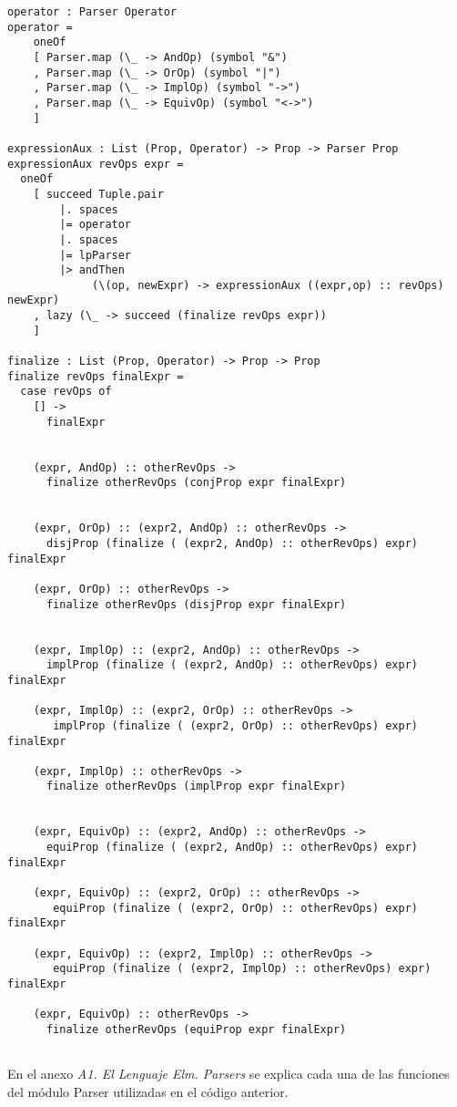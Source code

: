 \documentclass[a4paper]{report}
\begin{document}
\begin{lstlisting}[caption={Módulo LP\_Parser}, mathescape=true]
operator : Parser Operator
operator = 
    oneOf
    [ Parser.map (\_ -> AndOp) (symbol "&")
    , Parser.map (\_ -> OrOp) (symbol "|")
    , Parser.map (\_ -> ImplOp) (symbol "->")
    , Parser.map (\_ -> EquivOp) (symbol "<->")
    ]

expressionAux : List (Prop, Operator) -> Prop -> Parser Prop
expressionAux revOps expr =
  oneOf
    [ succeed Tuple.pair
        |. spaces
        |= operator
        |. spaces
        |= lpParser
        |> andThen 
             (\(op, newExpr) -> expressionAux ((expr,op) :: revOps) newExpr)
    , lazy (\_ -> succeed (finalize revOps expr))
    ]

finalize : List (Prop, Operator) -> Prop -> Prop
finalize revOps finalExpr =
  case revOps of
    [] ->
      finalExpr

     
    (expr, AndOp) :: otherRevOps ->
      finalize otherRevOps (conjProp expr finalExpr)


    (expr, OrOp) :: (expr2, AndOp) :: otherRevOps ->
      disjProp (finalize ( (expr2, AndOp) :: otherRevOps) expr) finalExpr

    (expr, OrOp) :: otherRevOps ->
      finalize otherRevOps (disjProp expr finalExpr)


    (expr, ImplOp) :: (expr2, AndOp) :: otherRevOps ->
      implProp (finalize ( (expr2, AndOp) :: otherRevOps) expr) finalExpr

    (expr, ImplOp) :: (expr2, OrOp) :: otherRevOps ->
       implProp (finalize ( (expr2, OrOp) :: otherRevOps) expr) finalExpr

    (expr, ImplOp) :: otherRevOps ->
      finalize otherRevOps (implProp expr finalExpr)


    (expr, EquivOp) :: (expr2, AndOp) :: otherRevOps ->
      equiProp (finalize ( (expr2, AndOp) :: otherRevOps) expr) finalExpr

    (expr, EquivOp) :: (expr2, OrOp) :: otherRevOps ->
       equiProp (finalize ( (expr2, OrOp) :: otherRevOps) expr) finalExpr

    (expr, EquivOp) :: (expr2, ImplOp) :: otherRevOps ->
       equiProp (finalize ( (expr2, ImplOp) :: otherRevOps) expr) finalExpr

    (expr, EquivOp) :: otherRevOps ->
      finalize otherRevOps (equiProp expr finalExpr)
      
\end{lstlisting}


En el anexo \textit{A1. El Lenguaje Elm. Parsers} se explica cada una de las funciones del módulo Parser utilizadas en el código anterior.
\end{document}
